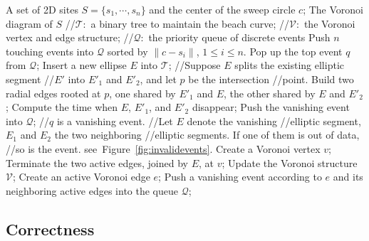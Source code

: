 {{\begin{algorithm}
\begin{algorithmic}[1]
 A set of 2D sites $S=\{s_1,\cdots,s_n\}$ and the center of
the sweep circle $c$;
 The Voronoi diagram of $S$
\State  //$\mathcal{T}:$ a binary tree to maintain the beach curve;
\State  //$\mathcal{V}:$ the Voronoi vertex and edge structure;
\State  //$\mathcal{Q}:$ the priority queue of discrete events
\State  Push $n$ touching events into $\mathcal{Q}$ sorted by
$\|c-s_i\|$, $1\leq i\leq n$.
    \State Pop up the top event $q$ from $\mathcal{Q}$;
        \State Insert a new ellipse $E$ into $\mathcal{T}$;
        \State //Suppose $E$ splits the existing elliptic segment
        \State //$E'$ into $E'_1$ and $E'_2$, and let $p$ be the intersection
        \State //point.
        \State Build two radial edges rooted at $p$, one shared by $E'_1$ and $E$, the other shared by $E$ and $E'_2$;
        \State Compute the time when $E$, $E'_1$, and $E'_2$ disappear;
        \State Push the vanishing event into $\mathcal{Q}$;
        \State //$q$ is a vanishing event.
        \State //Let $E$ denote the vanishing
        \State //elliptic segment, $E_1$ and $E_2$ the two neighboring
        \State //elliptic segments. If one of them is out of data,
        \State //so is the event. see~Figure~\ref{fig:invalidevents}.
        \State Create a Voronoi vertex $v$;
        \State Terminate the two active edges, joined by $E$, at $v$;
        \State Update the Voronoi structure $\mathcal{V}$;
        \State Create an active Voronoi edge $e$;
        \State Push a vanishing event according to $e$ and its neighboring active edges into the queue $\mathcal{Q}$;
    \EndIf
\EndWhile
\end{algorithmic}
\end{algorithm}

\subsection{Correctness}\label{sec:correctness}

}}
